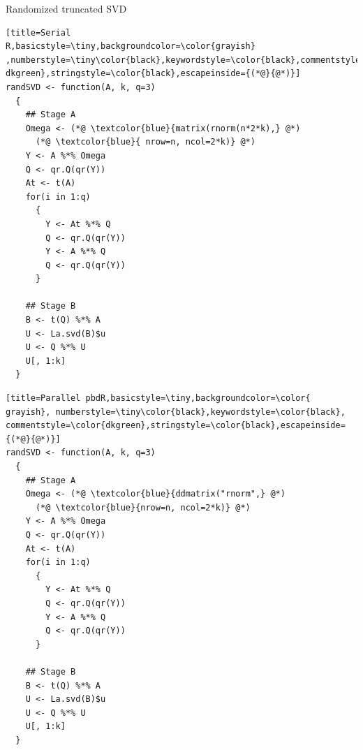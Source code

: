 \begin{frame}[fragile]
 \fontsize{8pt}{10}\selectfont
\begin{block}{Randomized truncated SVD}
  \hfill
  \begin{minipage}{0.430\textwidth}
\begin{lstlisting}[title=Serial 
R,basicstyle=\tiny,backgroundcolor=\color{grayish} 
,numberstyle=\tiny\color{black},keywordstyle=\color{black},commentstyle=\color{ 
dkgreen},stringstyle=\color{black},escapeinside={(*@}{@*)}]
randSVD <- function(A, k, q=3)
  {
    ## Stage A
    Omega <- (*@ \textcolor{blue}{matrix(rnorm(n*2*k),} @*)
      (*@ \textcolor{blue}{ nrow=n, ncol=2*k)} @*)
    Y <- A %*% Omega
    Q <- qr.Q(qr(Y))
    At <- t(A)
    for(i in 1:q)
      {
        Y <- At %*% Q
        Q <- qr.Q(qr(Y))
        Y <- A %*% Q
        Q <- qr.Q(qr(Y))
      }
    
    ## Stage B
    B <- t(Q) %*% A
    U <- La.svd(B)$u
    U <- Q %*% U
    U[, 1:k]
  }
\end{lstlisting} %
  \end{minipage}
  \hfill
  \begin{minipage}{0.430\textwidth}
\begin{lstlisting}[title=Parallel pbdR,basicstyle=\tiny,backgroundcolor=\color{
grayish}, numberstyle=\tiny\color{black},keywordstyle=\color{black},
commentstyle=\color{dkgreen},stringstyle=\color{black},escapeinside={(*@}{@*)}]
randSVD <- function(A, k, q=3)
  {
    ## Stage A
    Omega <- (*@ \textcolor{blue}{ddmatrix("rnorm",} @*)
      (*@ \textcolor{blue}{nrow=n, ncol=2*k)} @*)
    Y <- A %*% Omega
    Q <- qr.Q(qr(Y))
    At <- t(A)      
    for(i in 1:q)
      {
        Y <- At %*% Q   
        Q <- qr.Q(qr(Y))
        Y <- A %*% Q    
        Q <- qr.Q(qr(Y))
      }
    
    ## Stage B
    B <- t(Q) %*% A     
    U <- La.svd(B)$u 
    U <- Q %*% U     
    U[, 1:k]
  }
\end{lstlisting}  %
  \end{minipage}
\hfill
\end{block}
\end{frame}

